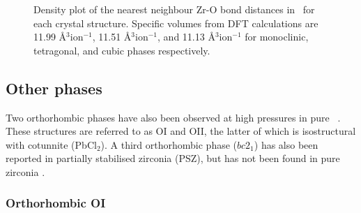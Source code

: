 \begin{figure}[ht]
\begin{center}
		\caption{Density plot of the nearest neighbour Zr-O bond distances in \zirconia\ for each crystal structure. Specific volumes from DFT calculations are 11.99 \r{A}$^{3}$ion$^{-1}$, 11.51 \r{A}$^{3}$ion$^{-1}$, and 11.13 \r{A}$^{3}$ion$^{-1}$ for monoclinic, tetragonal, and cubic phases respectively.}
		\label{figure:zrobonddistance}
	\end{center}
\end{figure}




\subsection{Other phases}

Two orthorhombic phases have also been observed at high pressures in pure \zirconia\ \cite{howard1991crystal}. These structures are referred to as OI and OII, the latter of which is isostructural with cotunnite (PbCl$_{2}$). A third orthorhombic phase ($bc2_{1}$) has also been reported in partially stabilised zirconia (PSZ), but has not been found in pure zirconia \cite{kisi1998crystal}.

\subsubsection{Orthorhombic OI}

